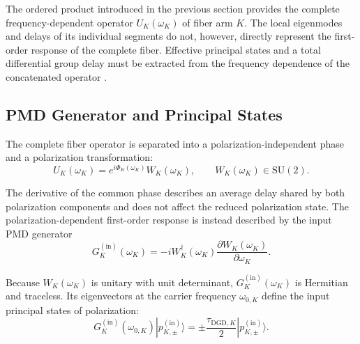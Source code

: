 The ordered product introduced in the previous section provides the complete
frequency-dependent operator \(U_K(\omega_K)\) of fiber arm \(K\). The local
eigenmodes and delays of its individual segments do not, however, directly
represent the first-order response of the complete fiber. Effective
principal states and a total differential group delay must be extracted from
the frequency dependence of the concatenated operator
\cite{gordon_kogelnik_pmd_2000}.


\subsection{PMD Generator and Principal States}
\label{subsec:complete_fiber_pmd_generator}

The complete fiber operator is separated into a polarization-independent
phase and a polarization transformation:
%
\begin{equation}
    U_K(\omega_K)
    =
    e^{i\Phi_K(\omega_K)}
    W_K(\omega_K),
    \qquad
    W_K(\omega_K)\in\mathrm{SU}(2).
    \label{eq:total_operator_recalled_for_pmd}
\end{equation}

The derivative of the common phase describes an average delay shared by both
polarization components and does not affect the reduced polarization state.
The polarization-dependent first-order response is instead described by the
input PMD generator
%
\begin{equation}
    G_K^{(\mathrm{in})}(\omega_K)
    =
    -i
    W_K^\dagger(\omega_K)
    \frac{
        \partial W_K(\omega_K)
    }{
        \partial\omega_K
    }.
    \label{eq:input_pmd_generator}
\end{equation}

Because \(W_K(\omega_K)\) is unitary with unit determinant,
\(G_K^{(\mathrm{in})}(\omega_K)\) is Hermitian and traceless. Its
eigenvectors at the carrier frequency \(\omega_{0,K}\) define the input
principal states of polarization:
%
\begin{equation}
    G_K^{(\mathrm{in})}(\omega_{0,K})
    |p_{K,\pm}^{(\mathrm{in})}\rangle
    =
    \pm
    \frac{\tau_{\mathrm{DGD},K}}{2}
    |p_{K,\pm}^{(\mathrm{in})}\rangle.
    \label{eq:complete_fiber_psp_eigenproblem}
\end{equation}

